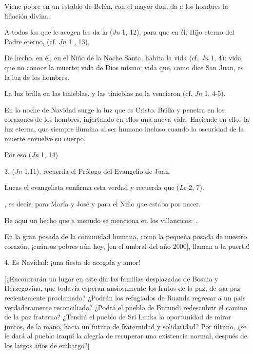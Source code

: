 \begin{body}
\begin{body}
		Viene pobre en un establo de Belén, con el mayor don: da a los hombres la filiación divina.

		A todos los que le acogen les da la  (\emph{Jn} 1, 12), para que en él, Hijo eterno del Padre eterno,  (cf. \emph{Jn} 1 , 13).

		De hecho, en él, en el Niño de la Noche Santa, habita la vida (cf. \emph{Jn} 1, 4): vida que no conoce la muerte; vida de Dios mismo; vida que, como dice San Juan, es la luz de los hombres.

		La luz brilla en las tinieblas, y las tinieblas no la vencieron (cf. \emph{Jn} 1, 4-5).

		En la noche de Navidad surge la luz que es Cristo. Brilla y penetra en los corazones de los hombres, injertando en ellos una nueva vida. Enciende en ellos la luz eterna, que siempre ilumina al ser humano incluso cuando la oscuridad de la muerte envuelve su cuerpo.

		Por eso  (\emph{Jn} 1, 14).

		3.  (\emph{Jn} 1,11), recuerda el Prólogo del Evangelio de Juan.

		Lucas el evangelista confirma esta verdad y recuerda que  (\emph{Lc} 2, 7).

		, es decir, para María y José y para el Niño que estaba por nacer.

		He aquí un hecho que a menudo se menciona en los villancicos: .

		En la gran posada de la comunidad humana, como la pequeña posada de nuestro corazón, ¡cuántos pobres aún hoy, {[}en el umbral del año 2000{]}, llaman a la puerta!

		4. Es Navidad: ¡una fiesta de acogida y amor!

		{[}¿Encontrarán un lugar en este día las familias desplazadas de Bosnia y Herzegovina, que todavía esperan ansiosamente los frutos de la paz, de esa paz recientemente proclamada? ¿Podrán los refugiados de Ruanda regresar a un país verdaderamente reconciliado? ¿Podrá el pueblo de Burundi redescubrir el camino de la paz fraterna? ¿Tendrá el pueblo de Sri Lanka la oportunidad de mirar juntos, de la mano, hacia un futuro de fraternidad y solidaridad? Por último, ¿se le dará al pueblo iraquí la alegría de recuperar una existencia normal, después de los largos años de embargo?{]}


\end{body}
\end{body}

